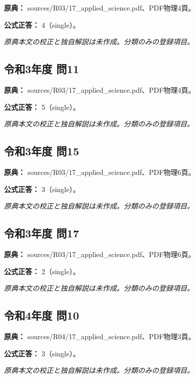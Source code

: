 \noindent\textbf{原典：} sources/R03/17\_applied\_science.pdf、PDF物理4頁。

\textbf{公式正答：} 4（single）。

\par\textit{原典本文の校正と独自解説は未作成。分類のみの登録項目。}

\subsection{令和3年度 問11}
\label{q:r03-reg-applied-11}

\noindent\textbf{原典：} sources/R03/17\_applied\_science.pdf、PDF物理4頁。

\textbf{公式正答：} 5（single）。

\par\textit{原典本文の校正と独自解説は未作成。分類のみの登録項目。}

\subsection{令和3年度 問15}
\label{q:r03-reg-applied-15}

\noindent\textbf{原典：} sources/R03/17\_applied\_science.pdf、PDF物理6頁。

\textbf{公式正答：} 3（single）。

\par\textit{原典本文の校正と独自解説は未作成。分類のみの登録項目。}

\subsection{令和3年度 問17}
\label{q:r03-reg-applied-17}

\noindent\textbf{原典：} sources/R03/17\_applied\_science.pdf、PDF物理6頁。

\textbf{公式正答：} 2（single）。

\par\textit{原典本文の校正と独自解説は未作成。分類のみの登録項目。}

\subsection{令和4年度 問10}
\label{q:r04-reg-applied-10}

\noindent\textbf{原典：} sources/R04/17\_applied\_science.pdf、PDF物理3頁。

\textbf{公式正答：} 3（single）。

\par\textit{原典本文の校正と独自解説は未作成。分類のみの登録項目。}

